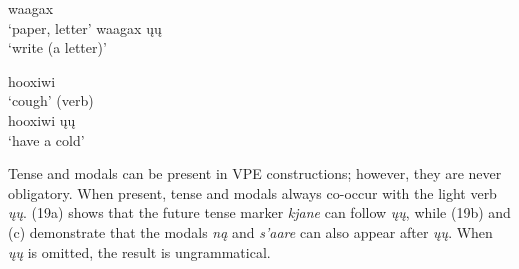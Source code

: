 \documentclass[output=paper]{LSP/langsci}
\begin{document}
\begin{exe}
\ex
\begin{multicols}{2}
\begin{xlist}
\ex
waagax\\
`paper, letter'
\ex
waagax \k{u}\k{u}\\
`write (a letter)'
\end{xlist}
\end{multicols}
\end{exe}

\pagebreak
\begin{exe}
\ex
\begin{multicols}{2}
\begin{xlist}
\ex
hooxiwi\\
`cough' (verb)\\

\ex
hooxiwi \k{u}\k{u}\\
`have a cold'
\end{xlist}
\end{multicols}
\end{exe}

Tense and modals can be present in VPE constructions; however, they are never obligatory. When present, tense and modals always co-occur with the light verb \emph{\k{u}\k{u}}. (19a) shows that the future tense marker \emph{kjane} can follow \emph{\k{u}\k{u}}, while (19b) and (c) demonstrate that the modals \emph{n\k{a}} and \emph{s'aare} can also appear after \emph{\k{u}\k{u}}. When \emph{\k{u}\k{u}} is omitted, the result is ungrammatical.
\end{document}

